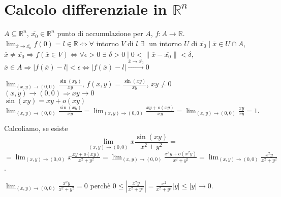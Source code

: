 \section{Calcolo differenziale in $\mathbb{R}^n$}

\begin{definition}
	$A \subseteq \mathbb{R}^n$, $\overline{x_0}\in \mathbb{R}^n$ punto di accumulazione per $A$, $f:A\rightarrow \mathbb{R}$. $ \lim_{\overline{x}\rightarrow\overline{x_0} }f(0)=l \in \mathbb{R}\Leftrightarrow \forall$ intorno $V$ di $l\,\, \exists\,\,$ un intorno $U$ di $\overline{x_0}\mid \overline{x}\in U \cap A$, $\overline{x}\neq \overline{x_0}\Rightarrow f(\overline{x}\in V) \Leftrightarrow \forall \epsilon >0\,\, \exists\,\, \delta >0\mid 0 < \|\overline{x}-\overline{x_0} \| <\delta$, $\overline{x}\in A\Rightarrow |f(\overline{x})-l|< \epsilon \Leftrightarrow |f(\overline{x})-l|\xrightarrow{\overline{x}\rightarrow\overline{x_0}}0$
\end{definition}


\begin{exbar}
	$\lim_{(x,y)\rightarrow(0,0)}\frac{\sin(xy)}{xy}$, $f(x,y)=\frac{\sin(xy)}{xy}$, $xy\neq 0$
	$(x,y)\rightarrow (0,0)\Rightarrow xy \rightarrow 0$\\
	$\sin(xy)=xy+o(xy)$
	$\lim_{(x,y)\rightarrow(0,0)} \frac{\sin(xy)}{xy}=\lim_{(x,y)\rightarrow(0,0)}\frac{xy+o(xy)}{xy}=\lim_{(x,y)\rightarrow(0,0)}\frac{xy}{xy}=1$.
\end{exbar}


\begin{exbar}
		Calcoliamo, se esiste
	\begin{equation*}
		\lim_{(x,y)\rightarrow(0,0)}x\frac{\sin(xy)}{x^2+y^2}=
	\end{equation*}
	$=\lim_{(x,y)\rightarrow(0,0)}x \frac{xy+o(xy)}{x^2+y^2}=\lim_{(x,y)\rightarrow(0,0)}\frac{x^2y+o(x^2y)}{x^2+y^2}=\lim_{(x,y)\rightarrow(0,0)}\frac{x^2y}{x^2+y^2}$.
	
	$\lim_{(x,y)\rightarrow(0,0)} \frac{x^2y}{x^2+y^2}=0 $ perchè $0 \leq |\frac{x^2y}{x^2+y^2}| = \frac{x^2}{x^2+y^2}|y|\leq |y| \rightarrow 0$.
\end{exbar}


